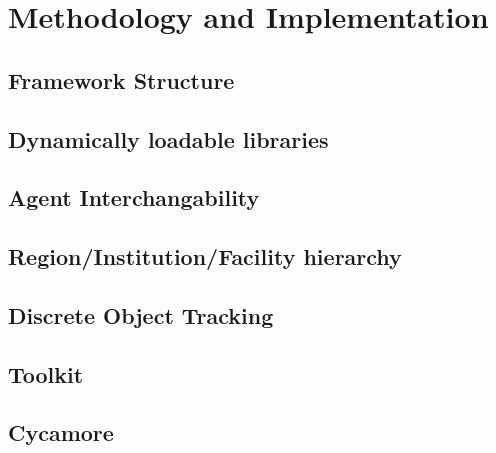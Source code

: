 \section{Methodology and Implementation}
\subsection{Framework Structure}
\subsection{Dynamically loadable libraries}
\subsection{Agent Interchangability}
\subsection{Region/Institution/Facility hierarchy}
\subsection{Discrete Object Tracking}
\subsection{Toolkit}
\subsection{Cycamore}

